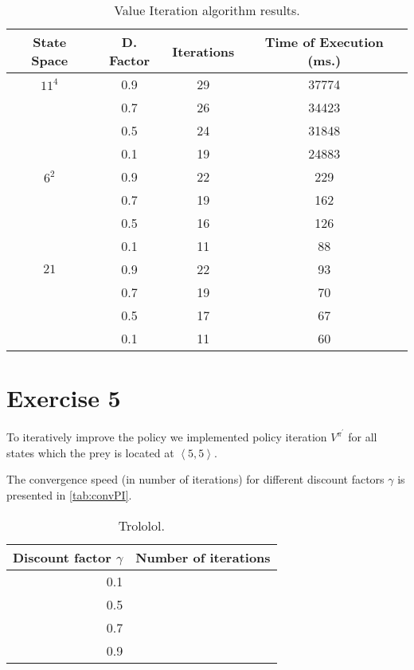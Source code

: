 \documentclass[a4paper,11pt]{article}
\begin{document}
\begin{table}[h!]
\caption{Value Iteration algorithm results. }
\label{viap}
\begin{center}
\begin{tabular}{c@{ }@{ }c@{ }@{ }c@{ }@{ }c}
\textbf{State Space} & \textbf{D. Factor} & \textbf{Iterations} & \textbf{Time of Execution (ms.)} \\
\midrule
$11^{4}$ 		& 0.9 				& 29 				& 37774 \\
				& 0.7 				& 26 				& 34423 	 \\
 				& 0.5 				& 24 				& 31848 	 \\
 				& 0.1 				& 19 				& 24883  \vspace{0.1cm}  \\ 
$6^{2}$			& 0.9 				& 22 				& 229 	 \\
				& 0.7 				& 19 				& 162  \\
				& 0.5 				& 16 				& 126 	 \\
				& 0.1 				& 11 				& 88 	 \vspace{0.1cm}  \\ 
$21$ 			& 0.9 				& 22 				& 93  \\
	 			& 0.7 				& 19 				& 70  \\
	 			& 0.5 				& 17 				& 67  \\
	 			& 0.1 				& 11 				& 60  \\
\end{tabular}
\end{center}
\end{table}

\section*{Exercise 5}
To iteratively improve the policy we implemented policy iteration $V^{\pi^\prime}$ for all states which the prey is located at $\left<5,5\right>$.

The convergence speed (in number of iterations) for different discount factors $\gamma$ is presented in \autoref{tab:convPI}.
\begin{table}
\caption{Trololol.}
\label{tab:convPI}
\begin{center}
\begin{tabular}{|@{ }r@{ }|@{ }r@{ }|}
\hline
Discount factor $\gamma$ & Number of iterations \\
\hline
0.1 & \\
0.5 & \\
0.7 & \\
0.9 & \\
\hline
\end{tabular}
\end{center}
\end{table}
\end{document}
